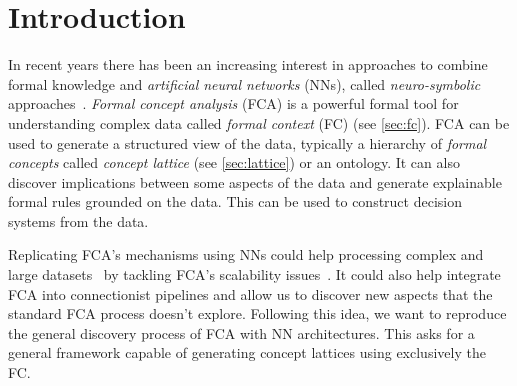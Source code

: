 \section{Introduction}
In recent years there has been an increasing interest in approaches to combine formal knowledge and \textit{artificial neural networks} (NNs), called \textit{neuro-symbolic} approaches~\cite{neuro-symbolic-survey:2017:many-authors,neuro-symbolic-computing:2019:many-authors}.
%
\textit{Formal concept analysis} (FCA) is a powerful  formal tool for understanding complex data called \textit{formal context} (FC) (see \cref{sec:fc}).
FCA can be used to generate a structured view of the data, typically a hierarchy of \textit{formal concepts} called \textit{concept lattice} (see \cref{sec:lattice}) or an ontology. %
It can also discover implications between some aspects of the data and generate explainable formal rules grounded on the data.
This can be used to construct decision systems from the data.

Replicating FCA's mechanisms using NNs could help processing complex and large datasets~\cite{fca2vec:2019:durrschnabel,lattice-based-nn:2017:kuznetsov} by tackling FCA's scalability issues~\cite{comparing-fca-algorithms:2010:kuznetov}.
It could also help integrate FCA into connectionist pipelines and allow us to discover new aspects that the standard FCA process doesn't explore.
Following this idea, we want to reproduce the general discovery process of FCA with NN architectures.
This asks for a general framework capable of generating concept lattices using exclusively the FC.

